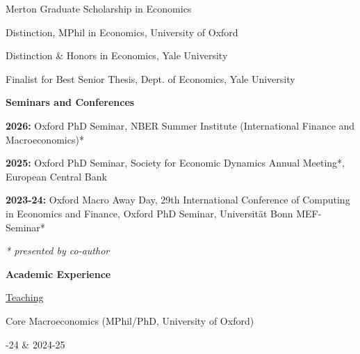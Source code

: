 \documentclass[letterpaper,10pt,oneside]{article}
\begin{document}
\noindent Merton Graduate Scholarship in Economics \hfill \begin{minipage}[t]{6cm} \end{minipage}

\noindent Distinction, MPhil in Economics, University of Oxford \hfill \begin{minipage}[t]{6cm} \end{minipage}

\noindent Distinction \& Honors in Economics, Yale University \hfill \begin{minipage}[t]{6cm} \end{minipage}

\noindent Finalist for Best Senior Thesis, Dept. of Economics, Yale University \hfill \begin{minipage}[t]{6cm} \end{minipage}

\vspace{3mm}

\noindent \large \textbf{Seminars and Conferences} 

\vspace{2mm}\normalsize
\noindent \textbf{2026:} Oxford PhD Seminar, NBER Summer Institute (International Finance and Macroeconomics)*

\vspace{0.5mm}
\noindent \textbf{2025:} Oxford PhD Seminar, Society for Economic Dynamics Annual Meeting*, European Central Bank

\vspace{0.5mm}
\noindent \textbf{2023-24:} Oxford Macro Away Day, 29th International Conference of Computing in Economics and Finance, Oxford PhD Seminar, Universität Bonn MEF-Seminar*
    
\noindent \textit{* presented by co-author}

\vspace{3mm}


\noindent \large \textbf{Academic Experience}
\vspace{2mm}

\noindent \normalsize \underline{Teaching}

\vspace{1mm}
\noindent  Core Macroeconomics (MPhil/PhD, University of Oxford)\hfill \begin{minipage}[t]{6cm}-24 \& 2024-25
\end{minipage}
\end{document}
